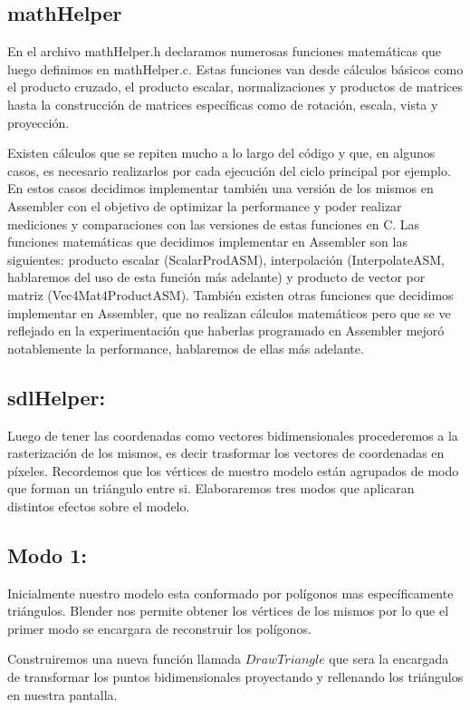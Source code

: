 \documentclass[a4paper]{article}
\begin{document}
\subsection{mathHelper}
En el archivo mathHelper.h declaramos numerosas funciones matemáticas que luego definimos en mathHelper.c. Estas funciones van desde cálculos básicos como el producto cruzado, el producto escalar, normalizaciones y productos de matrices hasta la construcción de matrices específicas como de rotación, escala, vista y proyección.
\par Existen cálculos que se repiten mucho a lo largo del código y que, en algunos casos, es necesario realizarlos por cada ejecución del ciclo principal por ejemplo. En estos casos decidimos implementar también una versión de los mismos en Assembler con el objetivo de optimizar la performance y poder realizar mediciones y comparaciones con las versiones de estas funciones en C. Las funciones matemáticas que decidimos implementar en Assembler son las siguientes: producto escalar (ScalarProdASM), interpolación (InterpolateASM, hablaremos del uso de esta función más adelante) y producto de vector por matriz (Vec4Mat4ProductASM). También existen otras funciones que decidimos implementar en Assembler, que no realizan cálculos matemáticos pero que se ve reflejado en la experimentación que haberlas programado en Assembler mejoró notablemente la performance, hablaremos de ellas más adelante.

\subsection{sdlHelper: }



Luego de tener las coordenadas como vectores bidimensionales procederemos a la rasterización de los mismos,  es decir trasformar los vectores de coordenadas en píxeles. Recordemos que los vértices de nuestro modelo están agrupados de  modo que forman un triángulo entre si. Elaboraremos tres modos que aplicaran distintos efectos sobre el modelo. 


\subsection{Modo 1:}



\par Inicialmente nuestro modelo esta conformado por polígonos mas específicamente triángulos. Blender nos permite obtener los vértices de los mismos por lo que el primer modo se encargara de reconstruir los polígonos.
\par Construiremos una nueva función llamada $DrawTriangle$ que sera la encargada de transformar los puntos bidimensionales proyectando y rellenando los triángulos en nuestra pantalla.
\end{document}
